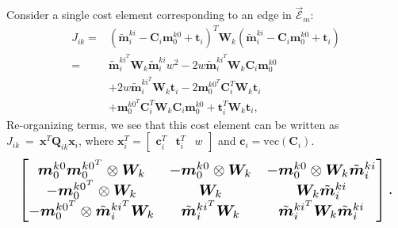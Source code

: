 \documentclass[lettersize,journal]{IEEEtran}
\newcommand{\EdgeSet}{\vec{\bm{\mathcal{E}}}}
\newcommand{\vect}[1]{\mbox{vec}(#1)}
\begin{document}
{Consider a single cost element corresponding to an edge in $\EdgeSet_m $:
\begin{align*}
	J_{ik}=&(\tilde{\bm{m}}_i^{ki} - \bm{C}_i\bm{m}_0^{k0} + \bm{t}_i)^T \bm{W}_k (\tilde{\bm{m}}_i^{ki} - \bm{C}_i\bm{m}_0^{k0} + \bm{t}_i) \\
	=& \tilde{\bm{m}}_i^{ki^T}\bm{W}_k\tilde{\bm{m}}_i^{ki} w^2 - 2 w\tilde{\bm{m}}_i^{ki^T}\bm{W}_k\bm{C}_i\bm{m}_0^{k0}  \\
	&+ 2 w\tilde{\bm{m}}_i^{ki^T}\bm{W}_k\bm{t}_i -2\bm{m}_0^{k0^T}\bm{C}_i^T\bm{W}_k\bm{t}_i\\
	& + \bm{m}_0^{k0^T}\bm{C}_i^T\bm{W}_k\bm{C}_i\bm{m}_0^{k0} + \bm{t}_i^T\bm{W}_k\bm{t}_i,
\end{align*}
Re-organizing terms, we see that this cost element can be written as $J_{ik}~=~\bm{x}^T\bm{Q}_{ik}\bm{x}_i$, where $ \bm{x}_i^T = \begin{bmatrix} \bm{c}_i^T &  \bm{t}_i^T & w \end{bmatrix} $ and $ \bm{c}_i=\vect{\bm{C}_i} $.
\begin{equation*}
	\resizebox{0.98\columnwidth}{!}{$\begin{bmatrix}
			\bm{m}_0^{k0}\bm{m}_0^{k0^T} \otimes \bm{W}_k  & -\bm{m}_0^{k0}\otimes\bm{W}_k & -\bm{m}_0^{k0}\otimes\bm{W}_k\tilde{\bm{m}}_i^{ki}\\
			 -\bm{m}_0^{k0^T}\otimes\bm{W}_k & \bm{W}_k & \bm{W}_k\tilde{\bm{m}}_i^{ki} \\
			-\bm{m}_0^{k0^T}\otimes\tilde{\bm{m}}_i^{ki^T}\bm{W}_k & \tilde{\bm{m}}_i^{ki^T}\bm{W}_k & \tilde{\bm{m}}_i^{ki^T}\bm{W}_k\tilde{\bm{m}}_i^{ki}
		\end{bmatrix}.$}
\end{equation*}

}
\end{document}
